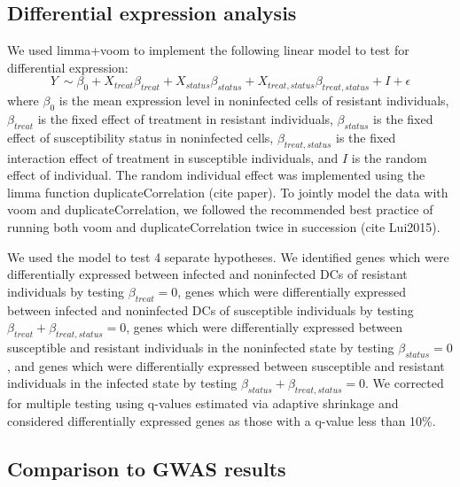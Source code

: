 \documentclass[fleqn,10pt]{wlscirep}
\begin{document}
\subsection*{Differential expression analysis}

We used limma+voom \cite{Smyth2004, Law2014, Ritchie2015} to implement
the following linear model to test for differential expression:
\begin{equation} \label{eq:limma}
Y\ \sim \beta_{0} + X_{treat}\beta_{treat} + X_{status}\beta_{status} + X_{treat,status}\beta_{treat,status} + I + \epsilon
\end{equation}
where $\beta_{0}$ is the mean expression level in noninfected cells of
resistant individuals, $\beta_{treat}$ is the fixed effect of
treatment in resistant individuals, $\beta_{status}$ is the fixed
effect of susceptibility status in noninfected cells,
$\beta_{treat,status}$ is the fixed interaction effect of treatment in
susceptible individuals, and $I$ is the random effect of individual.
The random individual effect was implemented using the limma function
duplicateCorrelation (cite paper). To jointly model the data with voom
and duplicateCorrelation, we followed the recommended best practice of
running both voom and duplicateCorrelation twice in succession (cite
Lui2015).

We used the model to test 4 separate hypotheses. We identified genes
which were differentially expressed between infected and noninfected
DCs of resistant individuals by testing $\beta_{treat} = 0$, genes
which were differentially expressed between infected and noninfected
DCs of susceptible individuals by testing $\beta_{treat} +
\beta_{treat,status} = 0$, genes which were differentially expressed
between susceptible and resistant individuals in the noninfected state
by testing $\beta_{status} = 0$, and genes which were differentially
expressed between susceptible and resistant individuals in the
infected state by testing $\beta_{status} + \beta_{treat,status} = 0$.
We corrected for multiple testing using q-values estimated via
adaptive shrinkage \cite{Stephens2016} and considered differentially
expressed genes as those with a q-value less than 10\%.
\subsection*{Comparison to GWAS results}
\end{document}
